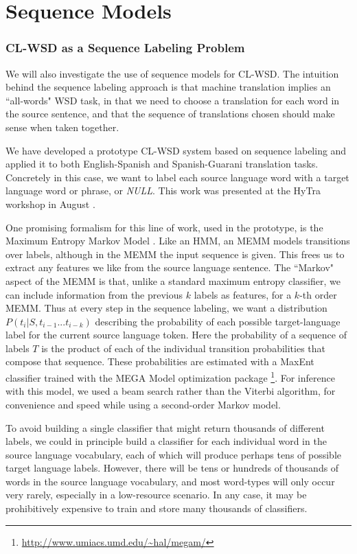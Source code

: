 \chapter{Sequence Models}

\subsection{CL-WSD as a Sequence Labeling Problem}
We will also investigate the use of sequence models for CL-WSD.
The intuition behind the sequence labeling approach is that machine translation
implies an ``all-words" WSD task, in that we need to choose a translation for
each word in the source sentence, and that the sequence of translations chosen
should make sense when taken together.

We have developed a prototype CL-WSD system based on sequence labeling and
applied it to both English-Spanish and Spanish-Guarani translation tasks.
Concretely in this case, we want to label each source language word with a
target language word or phrase, or \emph{NULL}.
This work was presented at the HyTra workshop in August
\cite{rudnick-gasser:2013:HyTra-2013}.

One promising formalism for this line of work, used in the prototype, is the
Maximum Entropy Markov Model \cite{icml00/mccallum}.
Like an HMM, an MEMM models transitions over labels, although in the MEMM the
input sequence is given.
This frees us to extract any features we like from the source language
sentence. The ``Markov" aspect of the MEMM is that, unlike a standard maximum
entropy classifier, we can include information from the previous $k$ labels as
features, for a $k$-th order MEMM.
Thus at every step in the sequence labeling, we want a distribution
$P(t_i | S, t_{i-1}...t_{i-k})$ describing the probability of each possible
target-language label for the current source language token.
Here the probability of a sequence of labels $T$ is the product of each of the
individual transition probabilities that compose that sequence.
These probabilities are estimated with a MaxEnt classifier trained with 
the MEGA Model optimization package
\footnote{\url{http://www.umiacs.umd.edu/~hal/megam/}}.
For inference with this model, we used a beam search rather than the Viterbi
algorithm, for convenience and speed while using a second-order Markov model.

To avoid building a single classifier that might return
thousands of different labels, we could in principle build a classifier for
each individual word in the source language vocabulary, each of which will
produce perhaps tens of possible target language labels. However, there will be
tens or hundreds of thousands of words in the source language vocabulary, and
most word-types will only occur very rarely, especially in a low-resource
scenario.
In any case, it may be prohibitively expensive to train and store many
thousands of classifiers.

